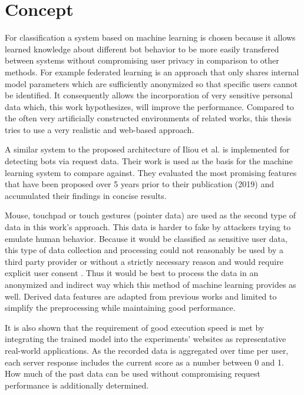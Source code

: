 \documentclass[
    fontsize=12pt,
    headings=small,
    parskip=half,           %
    bibliography=totoc,
    numbers=noenddot,       %
    open=any,               %
    final,                   %
    table
]{scrreprt}
\begin{document}
\section{Concept}

For classification a system based on machine learning is chosen because it allows learned knowledge about different bot behavior to be more easily transfered between systems without compromising user privacy in comparison to other methods. For example federated learning \cite{DBLP:journals/corr/KonecnyMR15} \cite{DBLP:journals/corr/KonecnyMRR16} is an approach that only shares internal model parameters which are sufficiently anonymized so that specific users cannot be identified. It consequently allows the incorporation of very sensitive personal data which, this work hypothesizes, will improve the performance. Compared to the often very artificially constructed environments of related works, this thesis tries to use a very realistic and web-based approach.

A similar system to the proposed architecture of Iliou et al. \cite{10.1145/3339252.3339267} is implemented for detecting bots via request data. Their work is used as the basis for the machine learning system to compare against. They evaluated the most promising features that have been proposed over 5 years prior to their publication (2019) and accumulated their findings in concise results.

Mouse, touchpad or touch gestures (pointer data) are used as the second type of data in this work's approach. This data is harder to fake by attackers trying to emulate human behavior. Because it would be classified as sensitive user data, this type of data collection and processing could not reasonably be used by a third party provider or without a strictly necessary reason and would require explicit user consent \cite{GDPR}. Thus it would be best to process the data in an anonymized and indirect way which this method of machine learning provides as well. Derived data features are adapted from previous works and limited to simplify the preprocessing while maintaining good performance.

It is also shown that the requirement of good execution speed is met by integrating the trained model into the experiments' websites as representative real-world applications. As the recorded data is aggregated over time per user, each server response includes the current score as a number between 0 and 1. How much of the past data can be used without compromising request performance is additionally determined.
\end{document}
